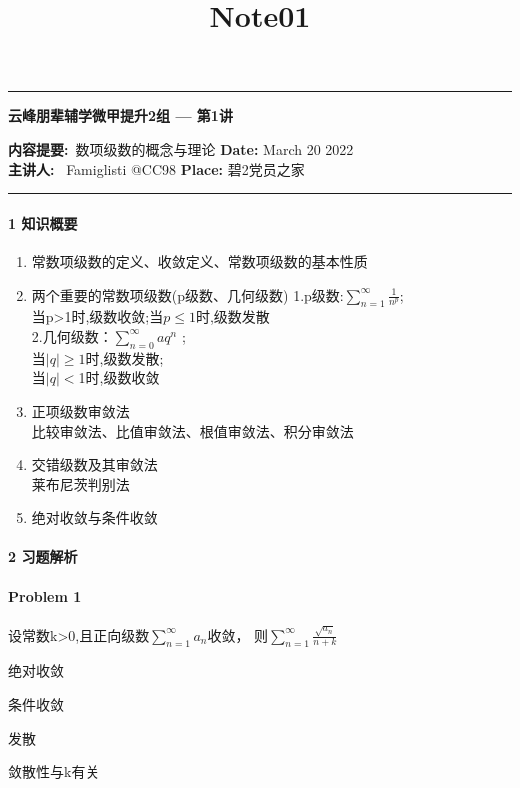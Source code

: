 \documentclass[12pt]{scrartcl}
\title{Note01}
\begin{document}
\begin{center}
	\hrule
	\vspace{.4cm}
	{\textbf { \large 云峰朋辈辅学微甲提升2组 --- 第1讲}}
\end{center}
{\textbf{内容提要:}\ 数项级数的概念与理论 \hspace{\fill} \textbf{Date:} March 20 2022    \\
{ \textbf{主讲人:}} \ Famiglisti @CC98  \hspace{\fill} \textbf{Place:} 碧2党员之家 \\
	\hrule

    
\paragraph*{\large 1 知识概要}
\begin{enumerate}
    \item  常数项级数的定义、收敛定义、常数项级数的基本性质
    \item  两个重要的常数项级数(p级数、几何级数)\newline
    1.p级数:$\sum_{n = 1}^{\infty} \frac{1}{n^p}$;\\
    当p>1时,级数收敛;当$p\leq 1$时,级数发散 \\
    2.几何级数：$\sum_{n = 0}^{\infty} aq^n $ ;\\
    当$\left\lvert q\right\rvert \geq 1$时,级数发散;\\
    当$\left\lvert q\right\rvert< $1时,级数收敛
    
    \item  正项级数审敛法\\
    比较审敛法、比值审敛法、根值审敛法、积分审敛法
    \item  交错级数及其审敛法\\
    莱布尼茨判别法
    \item  绝对收敛与条件收敛

\end{enumerate}

\paragraph*{\large 2 习题解析}

\paragraph*{Problem 1} %
设常数k>0,且正向级数$\sum_{n = 1}^{\infty} a_n $收敛，
则$\sum_{n = 1}^{\infty} \frac{\sqrt{a_n} }{n+k}  $
\begin{enumerate}[label={[\Alph*]}] 
    \item 绝对收敛
    \item 条件收敛
    \item 发散
    \item 敛散性与k有关


\end{enumerate}}
\end{document}
